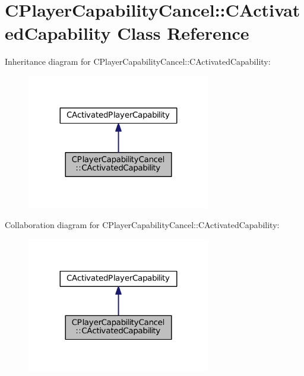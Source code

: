 \hypertarget{classCPlayerCapabilityCancel_1_1CActivatedCapability}{}\section{C\+Player\+Capability\+Cancel\+:\+:C\+Activated\+Capability Class Reference}
\label{classCPlayerCapabilityCancel_1_1CActivatedCapability}


Inheritance diagram for C\+Player\+Capability\+Cancel\+:\+:C\+Activated\+Capability\+:
\nopagebreak
\begin{figure}[H]
\begin{center}
\leavevmode
\includegraphics[width=227pt]{classCPlayerCapabilityCancel_1_1CActivatedCapability__inherit__graph}
\end{center}
\end{figure}


Collaboration diagram for C\+Player\+Capability\+Cancel\+:\+:C\+Activated\+Capability\+:
\nopagebreak
\begin{figure}[H]
\begin{center}
\leavevmode
\includegraphics[width=227pt]{classCPlayerCapabilityCancel_1_1CActivatedCapability__coll__graph}
\end{center}
\end{figure}
